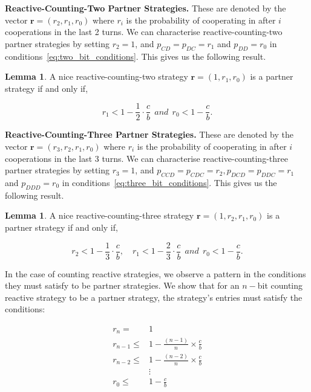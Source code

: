 \documentclass{article}
\theoremstyle{definition}
\newtheorem{lemma}[theorem]{Lemma}
\begin{document}
{\bf Reactive-Counting-Two Partner Strategies.} These are denoted by the vector
$\mathbf{r}=(r_2, r_1, r_0)$ where $r_i$ is the probability of cooperating in
after $i$ cooperations in the last 2 turns. We can characterise reactive-counting-two
partner strategies by setting $r_2 = 1$, and $p_{CD} = p_{DC} = r_1$ and $p_{DD} = r_0$
in conditions~\eqref{eq:two_bit_conditions}. This gives us the following result.

\begin{lemma}
A nice reactive-counting-two strategy $\mathbf{r} = (1, r_1, r_0)$ is a partner strategy if and only if,

\begin{equation}\label{eq:counting_two_bit_conditions}
  \displaystyle r_1 < 1-\frac{1}{2} \cdot \frac{c}{b} ~~and~~ r_0 < 1\!-\! \frac{c}{b}.
\end{equation}
\end{lemma}

{\bf Reactive-Counting-Three Partner Strategies.} These are denoted by the vector
$\mathbf{r}=(r_3, r_2, r_1, r_0)$ where $r_i$ is the probability of cooperating in
after $i$ cooperations in the last 3 turns. We can characterise reactive-counting-three
partner strategies by setting $r_3 = 1$, and $p_{CCD} = p_{CDC} = r_2,
p_{DCD} = p_{DDC} = r_1$ and $p_{DDD} = r_0$
in conditions~\eqref{eq:three_bit_conditions}. This gives us the following result.

\begin{lemma}
A nice reactive-counting-three strategy $\mathbf{r} = (1, r_2, r_1, r_0)$ is a partner strategy if and only if,

\begin{equation}\label{eq:counting_three_bit_conditions}
  \displaystyle r_2 < 1- \frac{1}{3} \cdot \frac{c}{b}, \quad r_1 < 1- \frac{2}{3} \cdot \frac{c}{b} ~~and~~ r_0 < 1\!-\! \frac{c}{b}.
\end{equation}
\end{lemma}

In the case of counting reactive strategies, we observe a pattern in the
conditions they must satisfy to be partner strategies. We show that for an $n-$bit
counting reactive strategy to be a partner strategy, the strategy's entries must
satisfy the conditions:

\begin{align*}
    r_{n}   = & 1 \\
    r_{n-1} \leq & 1  - \frac{(n - 1)}{n} \times \frac{c}{b}\\
    r_{n-2} \leq & 1  - \frac{(n - 2)}{n} \times \frac{c}{b}\\
    & \vdots \\
    r_{0} \leq &  1  - \frac{c}{b}\\
\end{align*}
\end{document}

